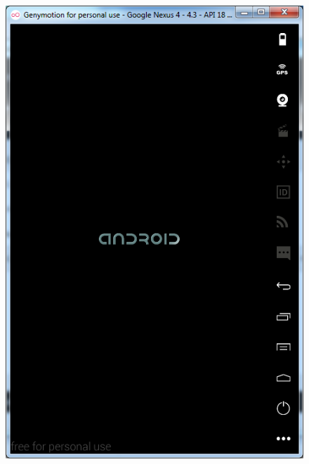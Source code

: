 \documentclass[13pt,a4paper]{extreport}
\begin{document}
\begin{itemize}
\begin{itemize}
\begin{figure}[!h]
\begin{center}
									{\includegraphics[scale=.5]{setup-genymotion-31}}
									\hspace{1.5cm}

\end{center}
\end{figure}
\end{itemize}
\end{itemize}
\end{document}
